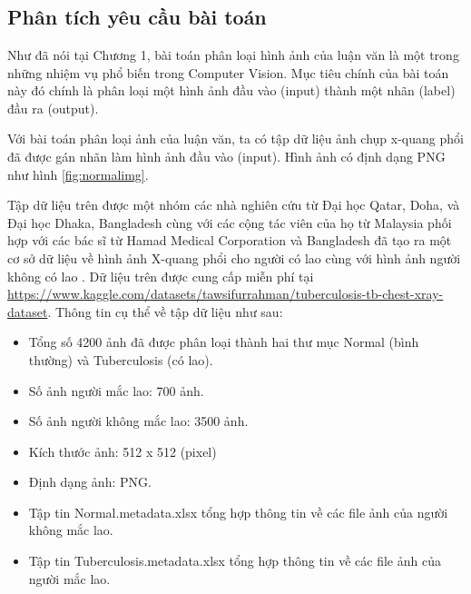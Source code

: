 \setcounter{chapter}{2}
\setcounter{section}{1}
\chapter{\tenchuongiii}
\section{Phân tích yêu cầu bài toán}
Như đã nói tại Chương 1, bài toán phân loại hình ảnh của luận văn là một trong những nhiệm vụ phổ biến trong Computer Vision. Mục tiêu chính của bài toán này đó chính là phân loại một hình ảnh đầu vào (input) thành một nhãn (label) đầu ra (output).  

Với bài toán phân loại ảnh của luận văn, ta có tập dữ liệu ảnh chụp x-quang phổi đã được gán nhãn làm hình ảnh đầu vào (input). Hình ảnh có định dạng PNG như hình \ref{fig:normalimg}.

Tập dữ liệu trên được một nhóm các nhà nghiên cứu từ Đại học Qatar, Doha, và Đại học Dhaka, Bangladesh cùng với các cộng tác viên của họ từ Malaysia phối hợp với các bác sĩ từ Hamad Medical Corporation và Bangladesh đã tạo ra một cơ sở dữ liệu về hình ảnh X-quang phổi cho người có lao cùng với hình ảnh người không có lao \cite{dataset}. Dữ liệu trên được cung cấp miễn phí tại \href{https://www.kaggle.com/datasets/tawsifurrahman/tuberculosis-tb-chest-xray-dataset}{https://www.kaggle.com/datasets/tawsifurrahman/tuberculosis-tb-chest-xray-dataset}. Thông tin cụ thể về tập dữ liệu như sau:
\begin{itemize}
	\item Tổng số 4200 ảnh đã được phân loại thành hai thư mục Normal (bình thường) và Tuberculosis (có lao).
	\item Số ảnh người mắc lao: 700 ảnh.
	\item Số ảnh người không mắc lao: 3500 ảnh.
	\item Kích thước ảnh: 512 x 512 (pixel)
	\item Định dạng ảnh: PNG.
	\item Tập tin Normal.metadata.xlsx tổng hợp thông tin về các file ảnh của người không mắc lao.
	\item Tập tin Tuberculosis.metadata.xlsx tổng hợp thông tin về các file ảnh của người mắc lao.
\end{itemize}

